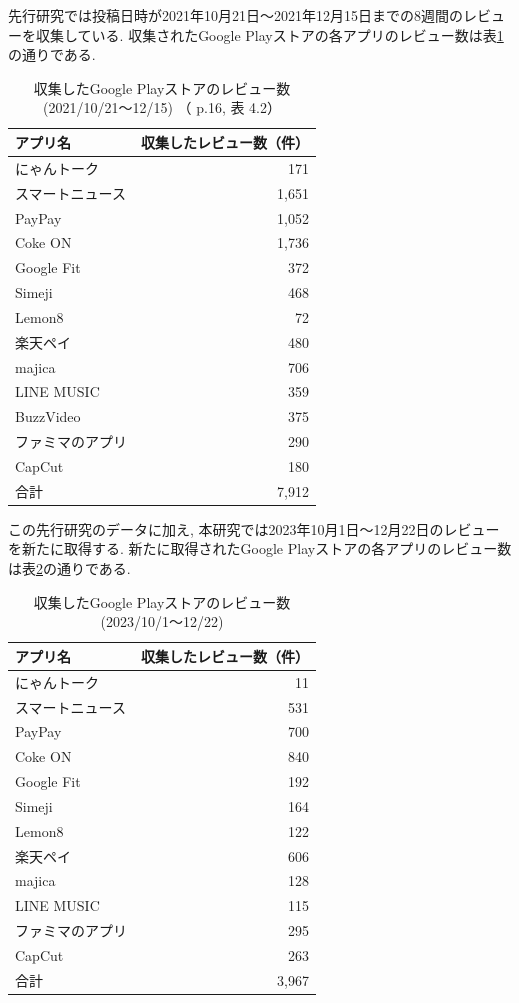 先行研究では投稿日時が2021年10月21日〜2021年12月15日までの8週間のレビューを収集している. 収集されたGoogle Playストアの各アプリのレビュー数は表\ref{tb:rawreviewnum}の通りである. 
\begin{table}[H]
  \caption{収集したGoogle Playストアのレビュー数 (2021/10/21〜12/15) （ \cite{kawatsura} p.16, 表 4.2）}
  \label{tb:rawreviewnum}
  \begin{center}
  \begin{tabular}{l|r}
    \hline
    アプリ名&収集したレビュー数（件）\\\hline\hline
    にゃんトーク&171\\\hline
    スマートニュース&1,651\\\hline
    PayPay&1,052\\\hline
    Coke ON&1,736\\\hline
    Google Fit&372\\\hline
    Simeji&468\\\hline
    Lemon8&72\\\hline
    楽天ペイ&480\\\hline
    majica&706\\\hline
    LINE MUSIC&359\\\hline
    BuzzVideo&375\\\hline
    ファミマのアプリ&290\\\hline
    CapCut&180\\\hline\hline
    合計&7,912
  \end{tabular}\end{center}
\end{table}

\noindent
この先行研究のデータに加え, 本研究では2023年10月1日〜12月22日のレビューを新たに取得する. 新たに取得されたGoogle Playストアの各アプリのレビュー数は表\ref{tb:rawreviewnum2023}の通りである. 
\begin{table}[H]
  \caption{収集したGoogle Playストアのレビュー数 (2023/10/1〜12/22) }
  \label{tb:rawreviewnum2023}
  \begin{center}
  \begin{tabular}{l|r}
    \hline
    アプリ名&収集したレビュー数（件）\\\hline\hline
    にゃんトーク&11\\\hline
    スマートニュース&531\\\hline
    PayPay&700\\\hline
    Coke ON&840\\\hline
    Google Fit&192\\\hline
    Simeji&164\\\hline
    Lemon8&122\\\hline
    楽天ペイ&606\\\hline
    majica&128\\\hline
    LINE MUSIC&115\\\hline
    ファミマのアプリ&295\\\hline
    CapCut&263\\\hline\hline
    合計&3,967
  \end{tabular}\end{center}
\end{table}

